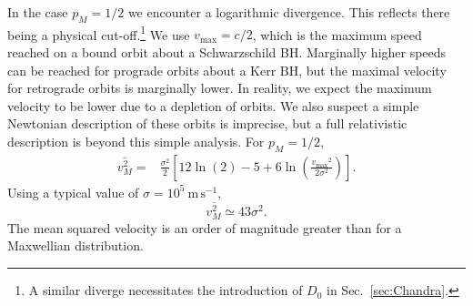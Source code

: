 \documentclass[useAMS,usedcolumn,usegraphicx,usenatbib]{mn2e}
\newcommand{\secref}[1]{Sec.~\ref{sec:#1}}
\newcommand{\units}[1]{\ensuremath{~\mathrm{#1}}}
\newcommand{\sub}[1]{\ensuremath{_\mathrm{#1}}}
\begin{document}
\begin{onecolumn}
In the case $p_M = 1/2$ we encounter a logarithmic divergence. This reflects there being a physical cut-off.\footnote{A similar diverge necessitates the introduction of $D_0$ in \secref{Chandra}.} We use $v\sub{max} = c/2$, which is the maximum speed reached on a bound orbit about a Schwarzschild BH. Marginally higher speeds can be reached for prograde orbits about a Kerr BH, but the maximal velocity for retrograde orbits is marginally lower. In reality, we expect the maximum velocity to be lower due to a depletion of orbits. We also suspect a simple Newtonian description of these orbits is imprecise, but a full relativistic description is beyond this simple analysis. For $p_M = 1/2$,
\begin{align}
\overline{v^2_{M}} = {} & \frac{\sigma^2}{2}\left[12\ln(2) - 5 + 6 \ln\left(\frac{v\sub{max}^2}{2\sigma^2}\right)\right].
\end{align}
Using a typical value of $\sigma = 10^5\units{m\,s^{-1}}$,
\begin{equation}
\overline{v^2_{M}} \simeq 43\sigma^2.
\end{equation}
The mean squared velocity is an order of magnitude greater than for a Maxwellian distribution.


\end{onecolumn}
\end{document}
